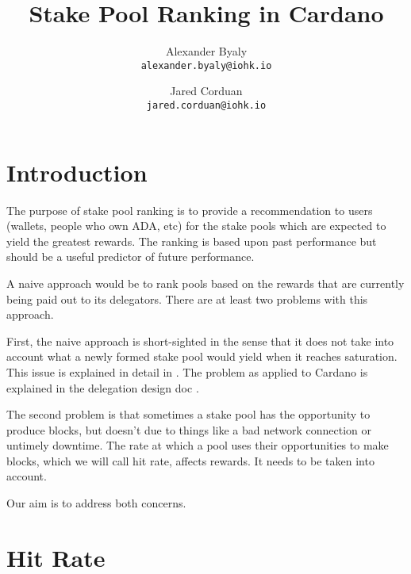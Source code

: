 \documentclass[11pt,a4paper,dvipsnames,twosided]{article}
\begin{document}
\title{Stake Pool Ranking in Cardano}

\author{Alexander Byaly  \\ {\small \texttt{alexander.byaly@iohk.io}} \\
   \and Jared Corduan  \\ {\small \texttt{jared.corduan@iohk.io}}}



\maketitle

\section{Introduction}

The purpose of stake pool ranking is to provide a recommendation to users
(wallets, people who own ADA, etc)
for the stake pools which are expected to yield the greatest rewards.
The ranking is based upon past performance but should be a useful predictor of future performance.

A naive approach would be to rank pools based on the rewards that are
currently being paid out to its delegators.
There are at least two problems with this approach.

First, the naive approach is short-sighted in the sense that it does not take into
account what a newly formed stake pool would yield when it reaches saturation.
This issue is explained in detail in \cite{bkks2018}. The problem as applied to
Cardano is explained in the delegation design doc \cite[Section 5.6]{delegation_design}.

The second problem is that sometimes a stake pool has the opportunity to produce blocks,
but doesn't due to things like a bad network connection or untimely downtime. The rate at
which a pool uses their opportunities to make blocks, which we will call hit rate, affects rewards.
It needs to be taken into account.

Our aim is to address both concerns.

\section{Hit Rate}
\end{document}
